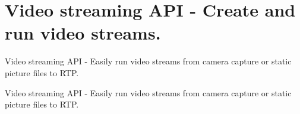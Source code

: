 \section{Video streaming A\+PI -\/ Create and run video streams.}
\label{group__video__stream__api}


Video streaming A\+PI -\/ Easily run video streams from camera capture or static picture files to R\+TP.  


Video streaming A\+PI -\/ Easily run video streams from camera capture or static picture files to R\+TP. 

